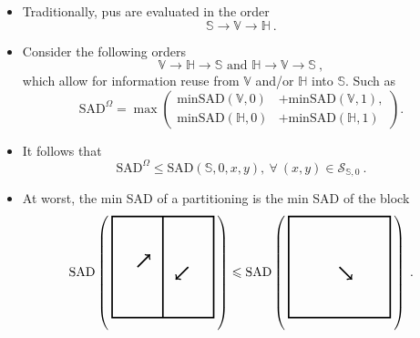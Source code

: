 \documentclass[10pt, sans, mathserif]{beamer}
\newcommand{\minsad}{
    \ensuremath{\text{minSAD}}
}
\newcommand{\lowersad}{
    \text{SAD}^\Omega
}
\begin{document}
\begin{frame}[t]
\begin{columns}[t, onlytextwidth]
\begin{column}{0.5\textwidth}
        \begin{block}{}
           \begin{itemize}
           \item Traditionally, \glspl{pu} are evaluated  in the order \[\mathbb{S} \rightarrow \mathbb{V} \rightarrow \mathbb{H}\:.\]
           \item Consider the following orders \[\mathbb{V} \rightarrow \mathbb{H} \rightarrow \mathbb{S} \text{ and } \mathbb{H} \rightarrow \mathbb{V} \rightarrow \mathbb{S}\:,\] which allow for information reuse from $\mathbb{V}$ and/or $\mathbb{H}$ into $\mathbb{S}$. Such as
        \begin{equation}
            \lowersad =
            \max \begin{pmatrix}
                 \minsad(\mathbb{V},0) &+ \minsad(\mathbb{V},1), \nonumber \\
                 \minsad(\mathbb{H},0) &+ \minsad(\mathbb{H},1)
            \end{pmatrix}.
        \end{equation}
        \item It follows that
        \[
            \lowersad \leqslant \text{SAD}(\mathbb{S},0,x,y),~\forall~ (x,y) \in  \mathcal{S}_{\mathbb{S},0} \:.
        \]
                \item At worst, the min SAD of a partitioning is the min SAD of the block
        \begin{equation*} \text{SAD} \left(\: \tikz[scale=0.70,baseline=-0.25cm,very thick]{\draw (-2,-2) rectangle (2,2); \draw (0,-2) -- (0,2); \draw[->] (-1, 0) -- (-0.5, 0.5); \draw[->] (1, 0) -- (0.5, -0.5);
        }\:\right) \leqslant \text{SAD} \left(\: \tikz[scale=0.70,baseline=-0.25cm,very thick]{\draw (-2,-2) rectangle (2,2);  \draw[->] (0, 0) -- (0.5, -0.5); }\:\right)\:.
        \end{equation*}
        \end{itemize}
        \end{block}



\end{column}
\end{columns}
\end{frame}
\end{document}
